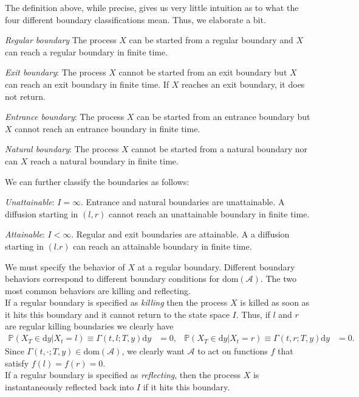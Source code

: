 \documentclass[12pt]{book}
\numberwithin{equation}{chapter}
\theoremstyle{plain}
\numberwithin{theorem}{section}
\theoremstyle{definition}
\numberwithin{exercise}{chapter}
\newcommand{\<}{\langle}
\renewcommand{\>}{\rangle}
\renewcommand{\(}{\left(}
\renewcommand{\)}{\right)}
\renewcommand{\[}{\left[}
\renewcommand{\]}{\right]}
\newcommand\Pb{\mathds{P}}
\newcommand\Ac{\mathscr{A}}
\newcommand\Gam{\Gamma}
\newcommand\dd{\mathrm{d}}
\begin{document}
\noindent
The definition above, while precise, gives us very little intuition as to what the four different boundary classifications mean.  Thus, we elaborate a bit.
\begin{itemize*}
\item \emph{Regular boundary} The process $X$ can be started from a regular boundary and $X$ can reach a regular boundary in finite time.
\item \emph{Exit boundary}: The process $X$ cannot be started from an exit boundary but $X$ can reach an exit boundary in finite time.  If $X$ reaches an exit boundary, it does not return.
\item \emph{Entrance boundary}: The process $X$ can be started from an entrance boundary but $X$ cannot reach an entrance boundary in finite time.
\item \emph{Natural boundary}: The process $X$ cannot be started from a natural boundary nor can $X$ reach a natural boundary in finite time.
\end{itemize*}
We can further classify the boundaries as follows:
\begin{itemize*}
\item \emph{Unattainable}: $I=\infty$.  Entrance and natural boundaries are unattainable.  A diffusion starting in $(l,r)$ cannot reach an unattainable boundary in finite time.
\item \emph{Attainable}: $I<\infty$.  Regular and exit boundaries are attainable. A a diffusion starting in $(l.r)$ can reach an attainable boundary in finite time.
\end{itemize*}
We must specify the behavior of $X$ at a regular boundary.
Different boundary behaviors correspond to different boundary conditions for $\text{dom}(\Ac)$.
The two most common behaviors are killing and reflecting.
\\[0.5em]
If a regular boundary is specified as \emph{killing} then the process $X$ is killed as soon as it hits this boundary and it cannot return to the state space $I$.  Thus, if $l$ and $r$ are regular killing boundaries we clearly have
\begin{align}
\Pb( X_T \in \dd y | X_t = l ) \equiv \Gam(t,l;T,y) \dd y
	&=	0 , &
\Pb( X_T \in \dd y | X_t = r ) \equiv \Gam(t,r;T,y) \dd y
	&=	0 .
\end{align}
Since $\Gam(t,\cdot;T,y) \in \text{dom}(\Ac)$, we clearly want $\Ac$ to act on functions $f$ that satisfy $f(l) = f(r) = 0$.
\\[0.5em]
If a regular boundary is specified as \emph{reflecting}, then the process $X$ is instantaneously reflected back into $I$ if it hits this boundary.
\end{document}
